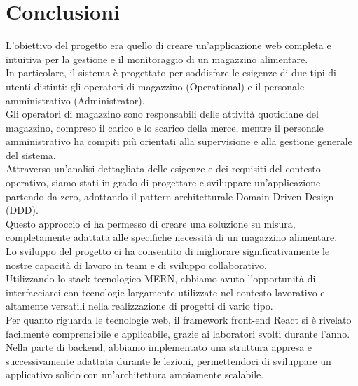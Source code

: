 \section{Conclusioni}

L’obiettivo del progetto era quello di creare un’applicazione web completa e intuitiva per la gestione e il monitoraggio di un magazzino alimentare.
\\In particolare, il sistema è progettato per soddisfare le esigenze di due tipi di utenti distinti: gli operatori di
magazzino (Operational) e il personale amministrativo (Administrator).\\ Gli operatori di magazzino sono responsabili
delle attività quotidiane del magazzino, compreso il carico e lo scarico della merce, mentre il personale amministrativo
ha compiti più orientati alla supervisione e alla gestione generale del sistema.\\

Attraverso un'analisi dettagliata delle esigenze e dei requisiti del contesto operativo, siamo stati in grado di
progettare e sviluppare un'applicazione partendo da zero, adottando il pattern architetturale Domain-Driven Design (DDD).\\
Questo approccio ci ha permesso di creare una soluzione su misura, completamente adattata alle specifiche necessità di un magazzino alimentare.\\

Lo sviluppo del progetto ci ha consentito di migliorare significativamente le nostre capacità di lavoro in team e di sviluppo collaborativo.\\
Utilizzando lo stack tecnologico MERN, abbiamo avuto l'opportunità di interfacciarci con tecnologie largamente utilizzate nel contesto lavorativo
e altamente versatili nella realizzazione di progetti di vario tipo.\\

Per quanto riguarda le tecnologie web, il framework front-end React si è rivelato facilmente comprensibile e applicabile,
grazie ai laboratori svolti durante l'anno. Nella parte di backend, abbiamo implementato una struttura appresa e successivamente
adattata durante le lezioni, permettendoci di sviluppare un applicativo solido con un'architettura ampiamente scalabile.\\

